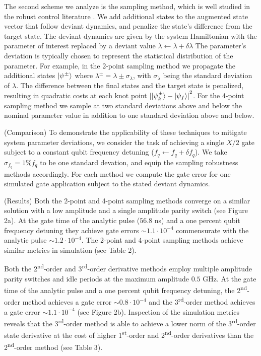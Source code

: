 \documentclass[
  amsfonts,
  amsmath,
  tbtags,
  amssymb,
  aps,
  nobibnotes,
  twocolumn,
  superscriptaddress,
]{revtex4-2}
\begin{document}
The second scheme we analyze is the sampling method,
which is well studied in the robust control literature
\cite{manchester2016derivative} \cite{tronarp2016sigma}.
We add additional
states to the augmented state vector that follow deviant dynamics, and
penalize the state's difference from the target state.
The deviant dynamics are given by the system
Hamiltonian with the parameter of interest replaced by
a deviant value $\lambda \gets \lambda + \delta \lambda$
The parameter's deviation is typically chosen
to represent the statistical distribution of the parameter.
For example, in the 2-point sampling method we
propagate the additional states $\ket{\psi^{\pm}}$ where
$\lambda^{\pm} = \lambda \pm \sigma_{\lambda}$, with
$\sigma_{\lambda}$ being the standard deviation of $\lambda$.
The difference between the final states and the target
state is penalized, resulting in quadratic costs at
each knot point
${\lvert \ket{\psi^{\pm}_{k}} - \ket{\psi_{f}} \rvert}^{2}$.
For the 4-point sampling method we sample at two standard deviations
above and below the nominal parameter value in addition to one standard
deviation above and below.

(Comparison) To demonstrate the applicability of these techniques
to mitigate system parameter deviations,
we consider the task of achieving a single $X/2$
gate subject to a constant qubit frequency detuning
($f_{q} \gets f_{q} + \delta f_{q}$).
We take $\sigma_{f_{q}} = 1\% f_{q}$ to be one standard devation, and equip
the sampling robustness methods accordingly.
For each method we compute the gate error for one simulated gate application
subject to the stated deviant dynamics.

(Results) Both the 2-point and 4-point
sampling methods converge on a similar solution with a low amplitude and
a single amplitude parity switch (see Figure 2a). At the gate time of the analytic pulse
($56.8$ ns) and a one percent qubit frequency detuning they achieve
gate errors $\sim 1.1 \cdot 10^{-4}$ commensurate with the analytic
pulse $\sim 1.2 \cdot 10^{-4}$. The 2-point and 4-point sampling methods
achieve similar metrics in simulation (see Table 2).

Both the 2\textsuperscript{nd}-order and 3\textsuperscript{rd}-order derivative methods
employ multiple amplitude parity switches and idle periods at the maximum
amplitude $0.5$ GHz. At the gate time of the analytic pulse and a one percent qubit
frequency detuning, the 2\textsuperscript{nd}-order method achieves a gate error
$\sim 0.8 \cdot 10^{-4}$ and the 3\textsuperscript{rd}-order method achieves a gate error
$\sim 1.1 \cdot 10^{-4}$ (see Figure 2b). Inspection of the simulation metrics reveals
that the 3\textsuperscript{rd}-order method is able to achieve a lower norm of the
3\textsuperscript{rd}-order state derivative at the cost of higher 1\textsuperscript{st}-order
and 2\textsuperscript{nd}-order derivatives than the 2\textsuperscript{nd}-order method (see Table 3).
\end{document}
